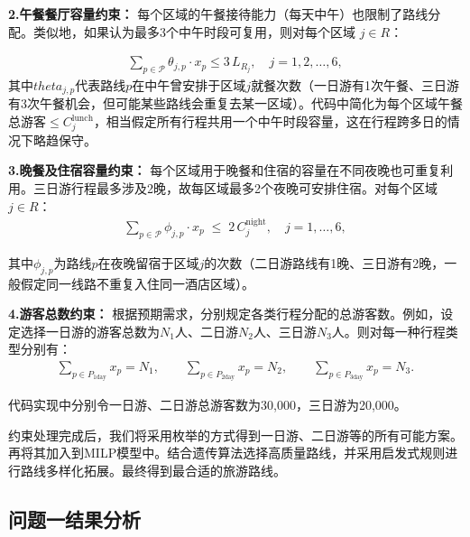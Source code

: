 \noindent\textbf{2.午餐餐厅容量约束：}
每个区域的午餐接待能力（每天中午）也限制了路线分配。类似地，如果认为最多3个中午时段可复用，则对每个区域 $j\in R$：

\begin{equation}
  \begin{aligned}
    \sum_{p\in \mathcal{P}}\theta_{j,p}\cdot x_{p} \leq 3\,L_{R_{j}},\quad j=1,2,\dots ,6,
  \end{aligned}
\end{equation}
其中$theta_{j,p}$代表路线$p$在中午曾安排于区域$j$就餐次数（一日游有1次午餐、三日游有3次午餐机会，但可能某些路线会重复去某一区域）。代码中简化为每个区域午餐总游客$\le C^{\text{lunch}}_j$，相当假定所有行程共用一个中午时段容量，这在行程跨多日的情况下略趋保守。

\noindent\textbf{3.晚餐及住宿容量约束：}
每个区域用于晚餐和住宿的容量在不同夜晚也可重复利用。三日游行程最多涉及2晚，故每区域最多2个夜晚可安排住宿。对每个区域 $j\in R$：
\begin{equation}
  \begin{aligned}
    \sum_{p\in \mathcal{P}}\phi_{j,p}\cdot x_p \;\le\; 2\,C^{\text{night}}_j, \quad j=1,\dots,6,
  \end{aligned}
\end{equation}

其中$\phi_{j,p}$为路线$p$在夜晚留宿于区域$j$的次数（二日游路线有1晚、三日游有2晚，一般假定同一线路不重复入住同一酒店区域）。

\noindent\textbf{4.游客总数约束：}
根据预期需求，分别规定各类行程分配的总游客数。例如，设定选择一日游的游客总数为$N_{1}$人、二日游$N_{2}$人、三日游$N_{3}$人。则对每一种行程类型分别有：
\begin{equation}
  \begin{aligned}
    \sum_{p\in P_{1\text{day}}}x_p = N_{1},\qquad \sum_{p\in P_{2\text{day}}}x_p = N_{2},\qquad \sum_{p\in P_{3\text{day}}}x_p = N_{3}.    
  \end{aligned}
\end{equation}

代码实现中分别令一日游、二日游总游客数为30,000，三日游为20,000。

约束处理完成后，我们将采用枚举的方式得到一日游、二日游等的所有可能方案。再将其加入到MILP模型中。结合遗传算法选择高质量路线，并采用启发式规则进行路线多样化拓展。最终得到最合适的旅游路线。

\subsection[\hspace{-2pt}问题一结果分析]{{\heiti{} \hspace{-8pt}问题一结果分析}}\label{section4: 问题一结果分析}


